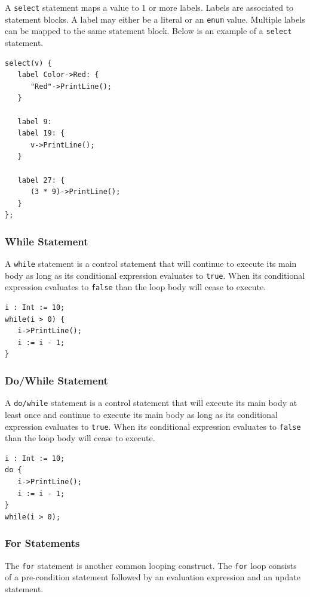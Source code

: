 \documentclass[12pt]{article}
\begin{document}
A \texttt{select} statement maps a value to 1 or more labels.  Labels are associated to statement blocks.  A label may either be a literal or an \texttt{enum} value.  Multiple labels can be mapped to the same statement block.  Below is an example of a \texttt{select} statement.

\begin{verbatim}
select(v) {
   label Color->Red: {
      "Red"->PrintLine();
   }

   label 9:
   label 19: {
      v->PrintLine();
   }

   label 27: {
      (3 * 9)->PrintLine();
   }
};
\end{verbatim}

\subsubsection{While Statement}

A \texttt{while} statement is a control statement that will continue to execute its main body as long as its conditional expression evaluates to \texttt{true}.  When its conditional expression evaluates to \texttt{false} than the loop body will cease to execute.

\begin{verbatim}
i : Int := 10;
while(i > 0) {
   i->PrintLine();
   i := i - 1;
}
\end{verbatim}

\subsubsection{Do/While Statement}

A \texttt{do/while} statement is a control statement that will execute its main body at least once and continue to execute its main body as long as its conditional expression evaluates to \texttt{true}.  When its conditional expression evaluates to \texttt{false} than the loop body will cease to execute.

\begin{verbatim}
i : Int := 10;
do { 
   i->PrintLine();
   i := i - 1;
} 
while(i > 0);
\end{verbatim}

\subsubsection{For Statements}

The \texttt{for} statement is another common looping construct.  The \texttt{for} loop consists of a pre-condition statement followed by an evaluation expression and an update statement.
\end{document}
